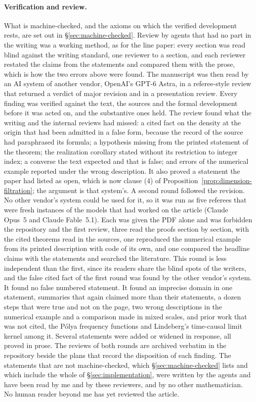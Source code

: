 \paragraph{Verification and review.} What is machine-checked, and the axioms on which the
verified development rests, are set out in \S\ref{sec:machine-checked}. Review by agents that
had no part in the writing was a working method, as for the line paper: every section was read
blind against the writing standard, one reviewer to a section, and each reviewer restated the
claims from the statements and compared them with the prose, which is how the two errors above
were found. The manuscript was then read by an AI system of another vendor, OpenAI's GPT-6
Astra, in a referee-style review that returned a verdict of major revision and in a
presentation review. Every finding was verified against the text, the sources and the formal development
before it was acted on, and the substantive ones held. The review found what the writing and
the internal reviews had missed: a cited fact on the density at the origin that had been
admitted in a false form, because the record of the source had paraphrased its formula; a
hypothesis missing from the printed statement of the \Matern{} theorem; the realization
corollary stated without its restriction to integer index; a converse the text expected and
that is false; and errors of the numerical example reported under the wrong description. It
also proved a statement the paper had listed as open, which is now clause (4) of
Proposition~\ref{prop:dimension-filtration}; the argument is that system's. A second round
followed the revision. No other vendor's system could be used for it, so it was run as five
referees that were fresh instances of the models that had worked on the article (Claude
Opus~5 and Claude Fable~5.1). Each was given the PDF alone and was forbidden the repository
and the first review, three read the proofs section by section, with the cited theorems read
in the sources, one reproduced the numerical example from its printed description with code
of its own, and one compared the headline claims with the statements and searched the
literature. This round is less independent than the first, since its readers share the blind
spots of the writers, and the false cited fact of the first round was found by the other
vendor's system. It found no false numbered statement. It found an imprecise domain in one
statement, summaries that again claimed more than their statements, a dozen steps that were
true and not on the page, two wrong descriptions in the numerical example and a comparison
made in mixed scales, and prior work that was not cited, the P\'olya frequency functions and
Lindeberg's time-causal limit kernel among it. Several statements were added or widened in
response, all proved in prose. The reviews of both rounds are archived verbatim in the
repository beside the plans that record the disposition of each finding. The statements that
are not machine-checked, which \S\ref{sec:machine-checked} lists and which include the whole
of \S\ref{sec:implementation}, were written by the agents and have been read by me and by
these reviewers, and by no other mathematician. No human reader beyond me has yet reviewed the
article.

